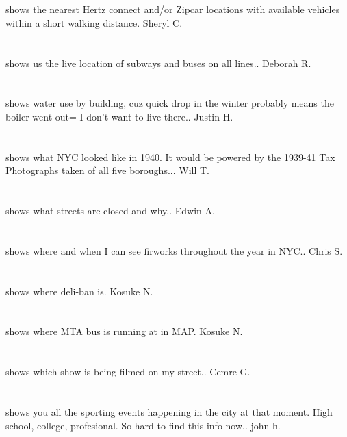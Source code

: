 \section{}shows the nearest Hertz connect and/or Zipcar locations with available vehicles within a short walking distance.  Sheryl C.
\section{}shows us the live location of subways and buses on all lines.. Deborah R.
\section{}shows water use by building,  cuz quick drop in the winter probably means the boiler went out= I don't want to live there.. Justin H.
\section{}shows what NYC looked like in 1940.  It would be powered by the 1939-41 Tax Photographs taken of all five boroughs... Will T.
\section{}shows what streets are closed and why.. Edwin A.
\section{}shows where and when I can see firworks throughout the year in NYC.. Chris S.
\section{}shows where deli-ban is. Kosuke N.
\section{}shows where MTA bus is running at in MAP. Kosuke N.
\section{}shows which show is being filmed on my street.. Cemre G.
\section{} shows you all the sporting events happening in the city at that moment.  High school,  college,  profesional. So hard to find this info now.. john h.
